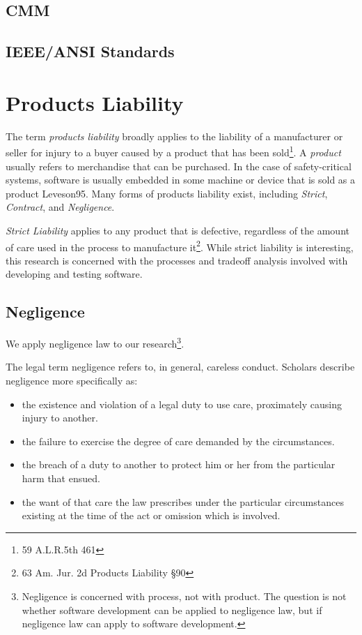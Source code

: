 \subsection{CMM}

\subsection{IEEE/ANSI Standards}

\section{Products Liability}
The term \textit{products liability} broadly applies to the liability of a
manufacturer or seller for injury to a buyer caused by a product that has been
sold\footnote{59 A.L.R.5th 461}. A \textit{product} usually refers to
merchandise that can be purchased. In the case of safety-critical systems,
software is usually embedded in some machine or device that is sold as a product
\cite{refs}{Leveson95}. Many forms of products liability exist, including
\textit{Strict}, \textit{Contract}, and \textit{Negligence}.

\textit{Strict Liability} applies to any product that is defective, regardless
of the amount of care used in the process to manufacture it\footnote{63 Am. Jur.
2d Products Liability \S 90}. While strict liability is interesting, this
research is concerned with the processes and tradeoff analysis involved with
developing and testing software. 

\subsection{Negligence}\label{S:Negligence}
We apply negligence law to our research\footnote{Negligence is 
concerned with process, not with product. The question is not whether software 
development can be applied to negligence law, but if negligence law can apply to
software development.}.

The legal term negligence refers to, in general, careless conduct. Scholars
describe negligence more specifically as:

\singlespace
\begin{itemize}
 \item the existence and violation of a legal duty to use care, proximately 
 causing injury to another.
 \item the failure to exercise the degree of care demanded by the circumstances.
 \item the breach of a duty to another to protect him or her from the particular
 harm that ensued.
 \item the want of that care the law prescribes under the particular
 circumstances existing at the time of the act or omission which is involved.
\end{itemize}
\doublespace

